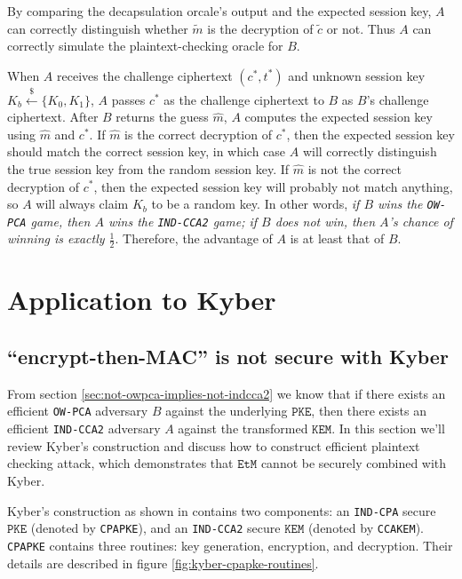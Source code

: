 \documentclass[floatrow,journal=tches,submission]{iacrtrans}
\newcommand{\monospace}{\texttt}
\newcommand{\pke}{\monospace{PKE}}
\newcommand{\kem}{\monospace{KEM}}
\newcommand{\etm}{\monospace{EtM}}  %
\newcommand{\leftsample}{\stackrel{\$}{\leftarrow}}
\begin{document}
By comparing the decapsulation orcale's output and the expected session key, $A$ can correctly distinguish whether $\tilde{m}$ is the decryption of $\tilde{c}$ or not. Thus $A$ can correctly simulate the plaintext-checking oracle for $B$.

When $A$ receives the challenge ciphertext $(c^\ast, t^\ast)$ and unknown session key $K_b \leftsample \{K_0, K_1\}$, $A$ passes $c^\ast$ as the challenge ciphertext to $B$ as $B$'s challenge ciphertext. After $B$ returns the guess $\hat{m}$, $A$ computes the expected session key using $\hat{m}$ and $c^\ast$. If $\hat{m}$ is the correct decryption of $c^\ast$, then the expected session key should match the correct session key, in which case $A$ will correctly distinguish the true session key from the random session key. If $\hat{m}$ is not the correct decryption of $c^\ast$, then the expected session key will probably not match anything, so $A$ will always claim $K_b$ to be a random key. In other words, \emph{if $B$ wins the \monospace{OW-PCA} game, then $A$ wins the \monospace{IND-CCA2} game; if $B$ does not win, then $A$'s chance of winning is exactly $\frac{1}{2}$}. Therefore, the advantage of $A$ is at least that of $B$.

\section{Application to Kyber}
\subsection{``encrypt-then-MAC'' is not secure with Kyber}
From section \ref{sec:not-owpca-implies-not-indcca2} we know that if there exists an efficient \monospace{OW-PCA} adversary $B$ against the underlying $\pke$, then there exists an efficient \monospace{IND-CCA2} adversary $A$ against the transformed $\kem$. In this section we'll review Kyber's construction and discuss how to construct efficient plaintext checking attack, which demonstrates that $\etm$ cannot be securely combined with Kyber.

Kyber's construction as shown in \cite{avanzi2019crystals} contains two components: an \monospace{IND-CPA} secure $\pke$ (denoted by \monospace{CPAPKE}), and an \monospace{IND-CCA2} secure $\kem$ (denoted by \monospace{CCAKEM}). \monospace{CPAPKE} contains three routines: key generation, encryption, and decryption. Their details are described in figure \ref{fig:kyber-cpapke-routines}.
\end{document}
